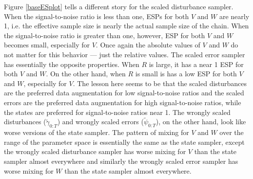 \documentclass{article}
\begin{document}
Figure \ref{baseESplot} tells a different story for the scaled disturbance sampler. When the signal-to-noise ratio is less than one, ESPs for both $V$ and $W$ are nearly 1, i.e. the effective sample size is nearly the actual sample size of the chain. When the signal-to-noise ratio is greater than one, however, ESP for both $V$ and $W$ becomes small, especially for $V$. Once again the absolute values of $V$ and $W$ do not matter for this behavior --- just the relative values. The scaled error sampler has essentially the opposite properties. When $R$ is large, it has a near 1 ESP for both $V$ and $W$. On the other hand, when $R$ is small is has a low ESP for both $V$ and $W$, especially for $V$. The lesson here seems to be that the scaled disturbances are the preferred data augmentation for low signal-to-noise ratios and the scaled errors  are the preferred data augmentation for high signal-to-noise ratios, while the states are preferred for signal-to-noise ratios near 1. The wrongly scaled disturbances ($\tilde{\gamma}_{0:T}$) and wrongly scaled errors ($\tilde{\psi}_{0:T}$), on the other hand, look like worse versions of the state sampler. The pattern of mixing for $V$ and $W$ over the range of the parameter space is essentially the same as the state sampler, except the wrongly scaled disturbance sampler has worse mixing for $V$ than the state sampler almost everywhere and similarly the wrongly scaled error sampler has worse mixing for $W$ than the state sampler almost everywhere.
\end{document}
